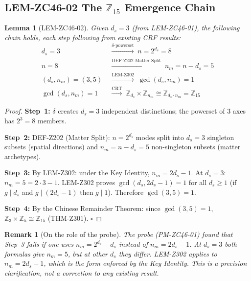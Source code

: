 \documentclass[12pt, a4paper]{article}
\newtheorem{lemma}{Lemma}[section]
\newtheorem{remark}{Remark}[section]
\begin{document}
\subsection{LEM-ZC46-02 \quad The $\mathbb{Z}_{15}$ Emergence Chain}


\begin{formalbox}[title={LEM-ZC46-02: $\mathbb{Z}_{15}$ Emerges
  from $d_s = 3$ via Existing Chain (Assembled)}]

\begin{lemma}[LEM-ZC46-02]
\label{lem:zc46-02}
Given $d_s = 3$ (from LEM-ZC46-01), the following chain holds,
each step following from existing CRF results:
\begin{align}
  d_s = 3
  &\;\xrightarrow{\delta\text{-powerset}}\;
  n = 2^{d_s} = 8
  \tag{Step~1}\\
  n = 8
  &\;\xrightarrow{\text{DEF-Z202 Matter Split}}\;
  n_m = n - d_s = 5
  \tag{Step~2}\\
  (d_s, n_m) = (3, 5)
  &\;\xrightarrow{\text{LEM-Z302}}\;
  \gcd(d_s, n_m) = 1
  \tag{Step~3}\\
  \gcd(d_s, n_m) = 1
  &\;\xrightarrow{\text{CRT}}\;
  \mathbb{Z}_{d_s} \times \mathbb{Z}_{n_m}
    \cong \mathbb{Z}_{d_s \cdot n_m} = \mathbb{Z}_{15}
  \tag{Step~4}
\end{align}
\end{lemma}

\begin{proof}
\textbf{Step~1:} $\delta$ creates $d_s = 3$ independent
distinctions; the powerset of 3 axes has $2^3 = 8$ members.

\textbf{Step~2:} DEF-Z202 (Matter Split): $n = 2^{d_s}$ modes
split into $d_s = 3$ singleton subsets (spatial directions) and
$n_m = n - d_s = 5$ non-singleton subsets (matter archetypes).

\textbf{Step~3:} By LEM-Z302: under the Key Identity,
$n_m = 2d_s - 1$. At $d_s = 3$: $n_m = 5 = 2\cdot 3 - 1$.
LEM-Z302 proves $\gcd(d_s, 2d_s - 1) = 1$ for all $d_s \geq 1$
(if $g \mid d_s$ and $g \mid (2d_s-1)$ then $g \mid 1$).
Therefore $\gcd(3, 5) = 1$.

\textbf{Step~4:} By the Chinese Remainder Theorem: since
$\gcd(3, 5) = 1$, $\mathbb{Z}_3 \times \mathbb{Z}_5 \cong
\mathbb{Z}_{15}$ (THM-Z301).
\hfill$\square$
\end{proof}

\begin{remark}[On the role of the probe]
The probe (PM-ZC46-01) found that Step~3 fails if one uses
$n_m = 2^{d_s} - d_s$ instead of $n_m = 2d_s - 1$.
At $d_s = 3$ both formulas give $n_m = 5$, but at other $d_s$
they differ. LEM-Z302 applies to $n_m = 2d_s - 1$, which is
the form enforced by the Key Identity. This is a precision
clarification, not a correction to any existing result.
\end{remark}
\end{formalbox}
\end{document}
